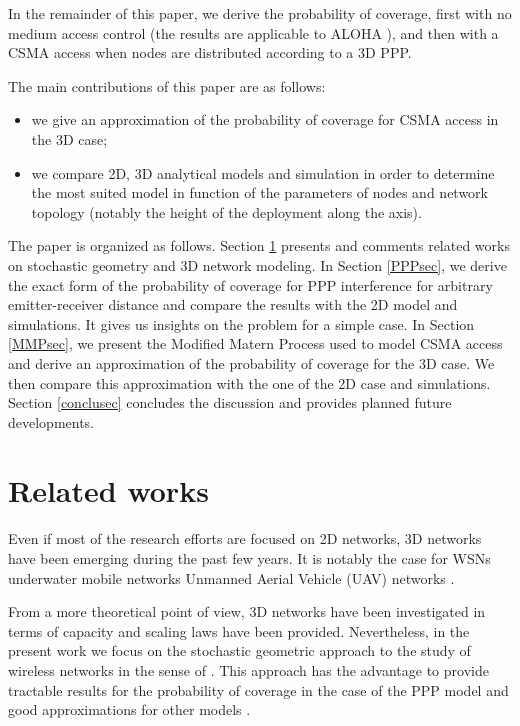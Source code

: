 \documentclass{sig-alternate-05-2015}
\begin{document}
In the remainder of this paper, we derive the probability of coverage, first with no medium access control (the results are applicable to ALOHA \cite{baccelli09}), and then with a CSMA access when nodes are distributed according to a 3D PPP.

The main contributions of this paper are as follows:
\begin{itemize}
 \item we give an approximation of the probability of coverage for CSMA access in the 3D case;
 \item we compare 2D, 3D analytical models and simulation in order to determine the most suited model in function of the parameters of nodes and network topology (notably the height of the deployment along the  axis).
\end{itemize}

The paper is organized as follows. Section \ref{RW} presents and comments related works on stochastic geometry and 3D network modeling. In Section \ref{PPPsec}, we derive the exact form of the probability of coverage for PPP interference for arbitrary emitter-receiver distance and compare the results with the 2D model and simulations. It gives us insights on the problem for a simple case. In Section \ref{MMPsec}, we present the Modified Matern Process used to model CSMA access and derive an approximation of the probability of coverage for the 3D case. We then compare this approximation with the one of the 2D case and simulations. Section \ref{conclusec} concludes the discussion and provides planned future developments.

\section{Related works}
\label{RW}

Even if most of the research efforts are focused on 2D networks, 3D networks have been emerging during the past few years. It is notably the case for WSNs \cite{zhou10,ammari10,doddavenkatappa12} underwater mobile networks \cite{cui06} Unmanned Aerial Vehicle (UAV) networks \cite{valente11}.

From a more theoretical point of view, 3D networks have been investigated in terms of capacity \cite{gupta00,li11} and scaling laws have been provided. Nevertheless, in the present work we focus on the stochastic geometric approach to the study of wireless networks in the sense of \cite{baccelli09,haenggi09}. This approach has the advantage to provide tractable results for the probability of coverage in the case of the PPP model and good approximations for other models \cite{baccelli09}.
\end{document}

